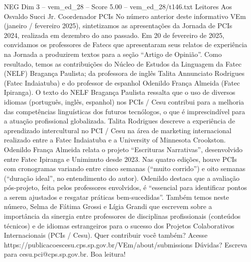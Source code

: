 \begin{textsample}{NEG Dim 3 – vem\_ed\_28 – Score 5.00 – vem\_ed\_28/t146.txt}  \label{ex:f3_neg_177}
Leitores Aos Osvaldo Succi Jr.
Coordenador PCIs No número anterior deste informativo VEm (janeiro / fevereiro 2025), sintetizamos as apresentações da Jornada de PCIs 2024, realizada em dezembro do ano passado.
Em 20 de fevereiro de 2025, convidamos os professores de Fatecs que apresentaram seus relatos de experiência na Jornada a produzirem textos para a seção “Artigo de Opinião”.
Como resultado, temos as contribuições do Núcleo de Estudos da Linguagem da Fatec (NELF) Bragança Paulista; da professora de inglês Talita Annunciato Rodrigues (Fatec Indaiatuba) e do professor de espanhol Odenildo França Almeida (Fatec Ipiranga).
O texto do NELF Bragança Paulista ressalta que o uso de diversos idiomas (português, inglês, espanhol) nos PCIs / Cesu contribui para a melhoria das competências linguísticas dos futuros tecnólogos, o que é imprescindível para a atuação profissional globalizada.
Talita Rodrigues descreve a experiência de aprendizado intercultural no PCI / Cesu na área de marketing internacional realizado entre a Fatec Indaiatuba e a University of Minnesota Crookston.
Odenildo França Almeida relata o projeto “Escrituras Narrativas”, desenvolvido entre Fatec Ipiranga e Uniminuto desde 2023.
Nas quatro edições, houve PCIs com cronogramas variando entre cinco semanas (“muito corrido”) e oito semanas (“duração ideal”, no entendimento do autor).
Odenildo destaca que a avaliação pós-projeto, feita pelos professores envolvidos, é “essencial para identificar pontos a serem ajustados e resgatar práticas bem-sucedidas”.
Também temos neste número, Selma de Fátima Grossi e Lígia Grandi que escrevem sobre a importância da sinergia entre professores de disciplinas profissionais (conteúdos técnicos) e de idiomas estrangeiros para o sucesso dos Projetos Colaborativos Internacionais (PCIs / Cesu).
Quer contribuir você também?
Acesse https://publicacoescesu.cps.sp.gov.br/VEm/about/submissions Dúvidas?
Escreva para cesu.pci@cps.sp.gov.br.
Boa leitura!

\end{textsample}
